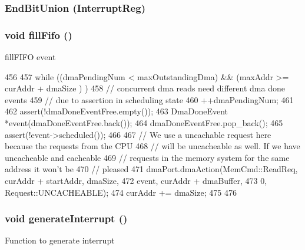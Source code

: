 \label{classPl111_ab87617f01d73eb885bbcaf6ae70a63ce}
\hypertarget{classPl111_a28c76606944b50cce3f43516e6178ea5}{
\subsubsection[{EndBitUnion}]{\setlength{\rightskip}{0pt plus 5cm}EndBitUnion (InterruptReg)}}
\label{classPl111_a28c76606944b50cce3f43516e6178ea5}
\hypertarget{classPl111_ab3d994fdac5f0732cdd0a027db03df46}{
\subsubsection[{fillFifo}]{\setlength{\rightskip}{0pt plus 5cm}void fillFifo ()}}
\label{classPl111_ab3d994fdac5f0732cdd0a027db03df46}
fillFIFO event 


\begin{DoxyCode}
456 {
457     while ((dmaPendingNum < maxOutstandingDma) && (maxAddr >= curAddr + dmaSize )
      ) {
458         // concurrent dma reads need different dma done events
459         // due to assertion in scheduling state
460         ++dmaPendingNum;
461 
462         assert(!dmaDoneEventFree.empty());
463         DmaDoneEvent *event(dmaDoneEventFree.back());
464         dmaDoneEventFree.pop_back();
465         assert(!event->scheduled());
466 
467         // We use a uncachable request here because the requests from the CPU
468         // will be uncacheable as well. If we have uncacheable and cacheable
469         // requests in the memory system for the same address it won't be
470         // pleased
471         dmaPort.dmaAction(MemCmd::ReadReq, curAddr + startAddr, dmaSize,
472                           event, curAddr + dmaBuffer,
473                           0, Request::UNCACHEABLE);
474         curAddr += dmaSize;
475     }
476 }
\end{DoxyCode}
\hypertarget{classPl111_ab251ef5c4d9e1f0239542a9d8aa0dc3e}{
\subsubsection[{generateInterrupt}]{\setlength{\rightskip}{0pt plus 5cm}void generateInterrupt ()}}
\label{classPl111_ab251ef5c4d9e1f0239542a9d8aa0dc3e}
Function to generate interrupt 


